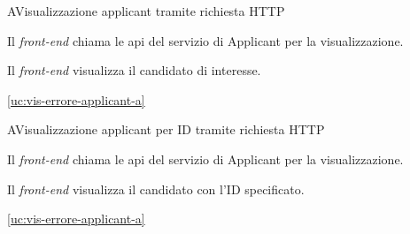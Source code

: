 \begin{usecase}{4}{A}{Visualizzazione applicant tramite richiesta HTTP}



	\begin{ucscenarioprincipale}
		\item Il \textit{front-end} chiama le \acrshort{api} del servizio di Applicant per la visualizzazione.
		\item Il \textit{front-end} visualizza il candidato di interesse.
	\end{ucscenarioprincipale}

	\begin{ucestensioni}
		\item \ref{uc:vis-errore-applicant-a}
	\end{ucestensioni}


	\label{uc:vis-applicant-http-a}
\end{usecase}

\begin{usecase}{4.1}{A}{Visualizzazione applicant per ID tramite richiesta HTTP}



	\begin{ucscenarioprincipale}
		\item Il \textit{front-end} chiama le \acrshort{api} del servizio di Applicant per la visualizzazione.
		\item Il \textit{front-end} visualizza il candidato con l'ID specificato.
	\end{ucscenarioprincipale}

	\begin{ucestensioni}
		\item \ref{uc:vis-errore-applicant-a}
	\end{ucestensioni}


	\label{uc:vis-applicant-id-http-a}
\end{usecase}

